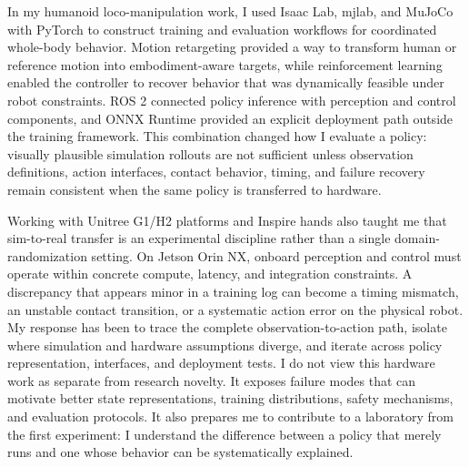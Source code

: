 \documentclass[11pt,letterpaper]{article}
\begin{document}
In my humanoid loco-manipulation work, I used Isaac Lab, mjlab, and MuJoCo with PyTorch to
construct training and evaluation workflows for coordinated whole-body behavior. Motion
retargeting provided a way to transform human or reference motion into embodiment-aware targets,
while reinforcement learning enabled the controller to recover behavior that was dynamically
feasible under robot constraints. ROS 2 connected policy inference with perception and control
components, and ONNX Runtime provided an explicit deployment path outside the training framework.
This combination changed how I evaluate a policy: visually plausible simulation rollouts are not
sufficient unless observation definitions, action interfaces, contact behavior, timing, and failure
recovery remain consistent when the same policy is transferred to hardware.

Working with Unitree G1/H2 platforms and Inspire hands also taught me that sim-to-real transfer is
an experimental discipline rather than a single domain-randomization setting. On Jetson Orin NX,
onboard perception and control must operate within concrete compute, latency, and integration
constraints. A discrepancy that appears minor in a training log can become a timing mismatch,
an unstable contact transition, or a systematic action error on the physical robot. My response
has been to trace the complete observation-to-action path, isolate where simulation and hardware
assumptions diverge, and iterate across policy representation, interfaces, and deployment tests.
I do not view this hardware work as separate from research novelty. It exposes failure modes that
can motivate better state representations, training distributions, safety mechanisms, and
evaluation protocols. It also prepares me to contribute to a laboratory from the first experiment:
I understand the difference between a policy that merely runs and one whose behavior can be
systematically explained.
\end{document}
